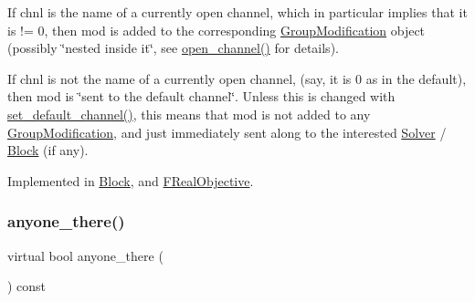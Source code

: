 \begin{DoxyItemize}
\item If chnl is the name of a currently open channel, which in particular implies that it is != 0, then mod is added to the corresponding \mbox{\hyperlink{class_s_m_spp__di__unipi__it_1_1_group_modification}{Group\+Modification}} object (possibly \char`\"{}nested inside it\char`\"{}, see \mbox{\hyperlink{class_s_m_spp__di__unipi__it_1_1_observer_acf7e46d450779f524e3655c5f31eecc8}{open\+\_\+channel()}} for details).
\item If chnl is not the name of a currently open channel, (say, it is 0 as in the default), then mod is \char`\"{}sent to the default channel\char`\"{}. Unless this is changed with \mbox{\hyperlink{class_s_m_spp__di__unipi__it_1_1_observer_a47f7642288d3e09ad9c792f86797840d}{set\+\_\+default\+\_\+channel()}}, this means that mod is not added to any \mbox{\hyperlink{class_s_m_spp__di__unipi__it_1_1_group_modification}{Group\+Modification}}, and just immediately sent along to the interested \mbox{\hyperlink{class_s_m_spp__di__unipi__it_1_1_solver}{Solver}} / \mbox{\hyperlink{class_s_m_spp__di__unipi__it_1_1_block}{Block}} (if any). 
\end{DoxyItemize}

Implemented in \mbox{\hyperlink{class_s_m_spp__di__unipi__it_1_1_block_a9b94536a10555dfb680e015fcb4787a8}{Block}}, and \mbox{\hyperlink{class_s_m_spp__di__unipi__it_1_1_f_real_objective_a9b94536a10555dfb680e015fcb4787a8}{F\+Real\+Objective}}.

\mbox{\label{class_s_m_spp__di__unipi__it_1_1_observer_a7d8dd42bea99dfdb6fb967ba17993560}} 
\subsubsection{\texorpdfstring{anyone\+\_\+there()}{anyone\_there()}}
{\footnotesize\ttfamily virtual bool anyone\+\_\+there (\begin{DoxyParamCaption}\item[{void}]{ }\end{DoxyParamCaption}) const\hspace{0.3cm}{\ttfamily [pure virtual]}}



